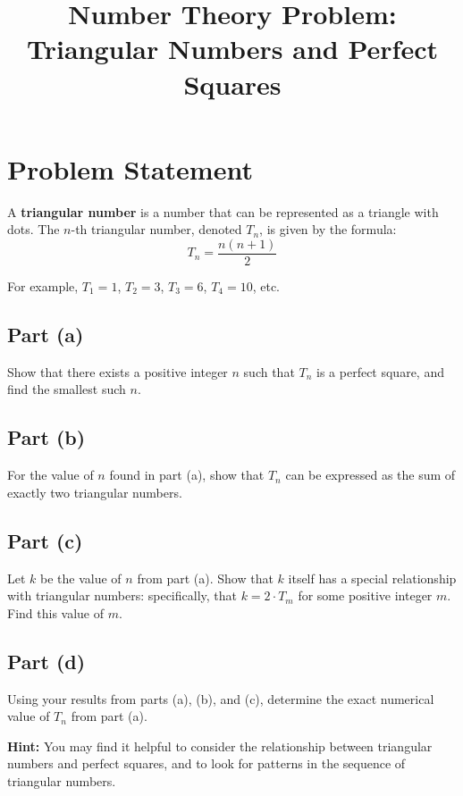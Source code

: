 \documentclass[12pt]{article}
\title{Number Theory Problem: Triangular Numbers and Perfect Squares}
\author{}
\date{}
\begin{document}
\maketitle

\section*{Problem Statement}

A \textbf{triangular number} is a number that can be represented as a triangle with dots. The $n$-th triangular number, denoted $T_n$, is given by the formula:
\[ T_n = \frac{n(n+1)}{2} \]

For example, $T_1 = 1$, $T_2 = 3$, $T_3 = 6$, $T_4 = 10$, etc.

\subsection*{Part (a)}
Show that there exists a positive integer $n$ such that $T_n$ is a perfect square, and find the smallest such $n$.

\subsection*{Part (b)}
For the value of $n$ found in part (a), show that $T_n$ can be expressed as the sum of exactly two triangular numbers.

\subsection*{Part (c)}
Let $k$ be the value of $n$ from part (a). Show that $k$ itself has a special relationship with triangular numbers: specifically, that $k = 2 \cdot T_m$ for some positive integer $m$. Find this value of $m$.

\subsection*{Part (d)}
Using your results from parts (a), (b), and (c), determine the exact numerical value of $T_n$ from part (a).

\vspace{0.5cm}

\textbf{Hint:} You may find it helpful to consider the relationship between triangular numbers and perfect squares, and to look for patterns in the sequence of triangular numbers.
\end{document}
